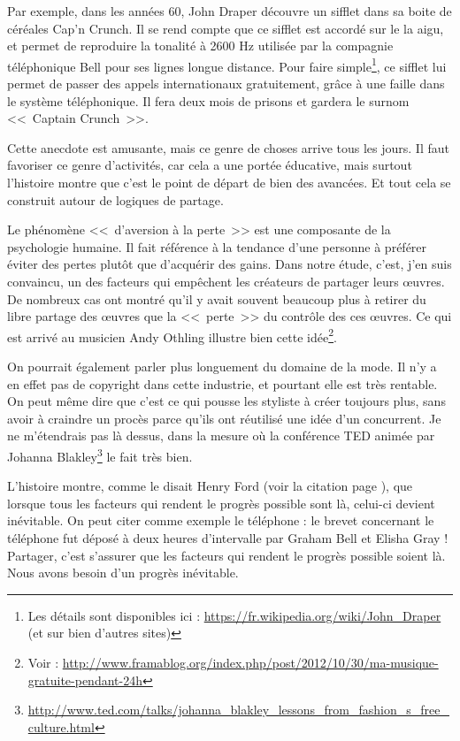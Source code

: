 Par exemple, dans les années 60, John Draper découvre un sifflet dans sa boite de céréales Cap'n Crunch.
Il se rend compte que ce sifflet est accordé sur le la aigu, et permet de reproduire la tonalité à 2600 Hz utilisée par la compagnie téléphonique Bell pour ses lignes longue distance.
Pour faire simple\footnote{Les détails sont disponibles ici : \url{https://fr.wikipedia.org/wiki/John_Draper} (et sur bien d'autres sites)}, ce sifflet lui permet de passer des appels internationaux gratuitement, grâce à une faille dans le système téléphonique.
Il fera deux mois de prisons et gardera le surnom <<~Captain Crunch~>>.

Cette anecdote est amusante, mais ce genre de choses arrive tous les jours.
Il faut favoriser ce genre d'activités, car cela a une portée éducative, mais surtout l'histoire montre que c'est le point de départ de bien des avancées.
Et tout cela se construit autour de logiques de partage.

Le phénomène <<~d'aversion à la perte~>> est une composante de la psychologie humaine.
Il fait référence à la tendance d'une personne à préférer éviter des pertes plutôt que d'acquérir des gains.
Dans notre étude, c'est, j'en suis convaincu, un des facteurs qui empêchent les créateurs de partager leurs œuvres.
De nombreux cas ont montré qu'il y avait souvent beaucoup plus à retirer du libre partage des œuvres que la <<~perte~>> du contrôle des ces œuvres.
Ce qui est arrivé au musicien Andy Othling illustre bien cette idée\footnote{Voir : \url{http://www.framablog.org/index.php/post/2012/10/30/ma-musique-gratuite-pendant-24h}}.

On pourrait également parler plus longuement du domaine de la mode.
Il n'y a en effet pas de copyright dans cette industrie, et pourtant elle est très rentable.
On peut même dire que c'est ce qui pousse les styliste à créer toujours plus, sans avoir à craindre un procès parce qu'ils ont réutilisé une idée d'un concurrent.
Je ne m'étendrais pas là dessus, dans la mesure où la conférence TED animée par Johanna Blakley\footnote{\url{http://www.ted.com/talks/johanna_blakley_lessons_from_fashion_s_free_culture.html}} le fait très bien.

L'histoire montre, comme le disait Henry Ford (voir la citation page \pageref{ford}), que lorsque tous les facteurs qui rendent le progrès possible sont là, celui-ci devient inévitable.
On peut citer comme exemple le téléphone : le brevet concernant le téléphone fut déposé à deux heures d'intervalle par Graham Bell et Elisha Gray !
Partager, c'est s'assurer que les facteurs qui rendent le progrès possible soient là.
Nous avons besoin d'un progrès inévitable.

